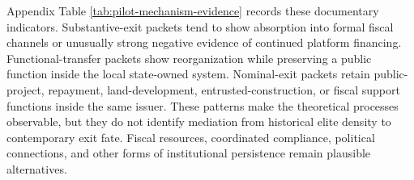 Appendix Table \ref{tab:pilot-mechanism-evidence} records these documentary
indicators. Substantive-exit packets tend to show absorption into formal fiscal
channels or unusually strong negative evidence of continued platform
financing. Functional-transfer packets show reorganization while preserving a
public function inside the local state-owned system. Nominal-exit packets retain
public-project, repayment, land-development, entrusted-construction, or fiscal
support functions inside the same issuer. These patterns make the theoretical
processes observable, but they do not identify mediation from historical elite
density to contemporary exit fate. Fiscal resources, coordinated compliance,
political connections, and other forms of institutional persistence remain
plausible alternatives.
